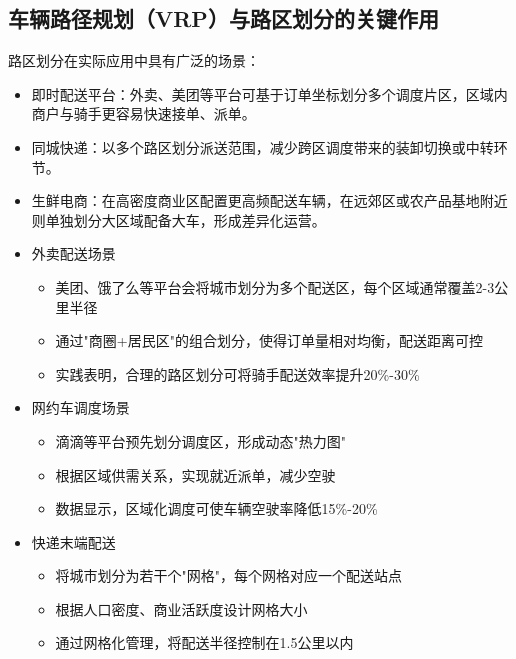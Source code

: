 \documentclass[12pt,a4paper,twoside]{ctexbook}
\begin{document}
\subsection{车辆路径规划（VRP）与路区划分的关键作用}
路区划分在实际应用中具有广泛的场景：

\begin{itemize}
\item 即时配送平台：外卖、美团等平台可基于订单坐标划分多个调度片区，区域内商户与骑手更容易快速接单、派单。

\item 同城快递：以多个路区划分派送范围，减少跨区调度带来的装卸切换或中转环节。

\item 生鲜电商：在高密度商业区配置更高频配送车辆，在远郊区或农产品基地附近则单独划分大区域配备大车，形成差异化运营。
\end{itemize}

\begin{itemize}
\item 外卖配送场景
    \begin{itemize}
    \item 美团、饿了么等平台会将城市划分为多个配送区，每个区域通常覆盖2-3公里半径
    \item 通过"商圈+居民区"的组合划分，使得订单量相对均衡，配送距离可控
    \item 实践表明，合理的路区划分可将骑手配送效率提升20\%-30\%
    \end{itemize}

\item 网约车调度场景
    \begin{itemize}
    \item 滴滴等平台预先划分调度区，形成动态"热力图"
    \item 根据区域供需关系，实现就近派单，减少空驶
    \item 数据显示，区域化调度可使车辆空驶率降低15\%-20\%
    \end{itemize}

\item 快递末端配送
    \begin{itemize}
    \item 将城市划分为若干个"网格"，每个网格对应一个配送站点
    \item 根据人口密度、商业活跃度设计网格大小
    \item 通过网格化管理，将配送半径控制在1.5公里以内
    \end{itemize}
\end{itemize}
\end{document}
